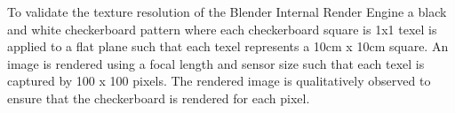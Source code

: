 To validate the texture resolution of the Blender Internal Render Engine a black and white checkerboard pattern where each checkerboard square is 1x1 texel is applied to a flat plane such that each texel represents a 10cm x 10cm square.  An image is rendered using a focal length and sensor size such that each texel is captured by 100 x 100 pixels.  The rendered image is qualitatively observed to ensure that the checkerboard is rendered for each pixel.   


